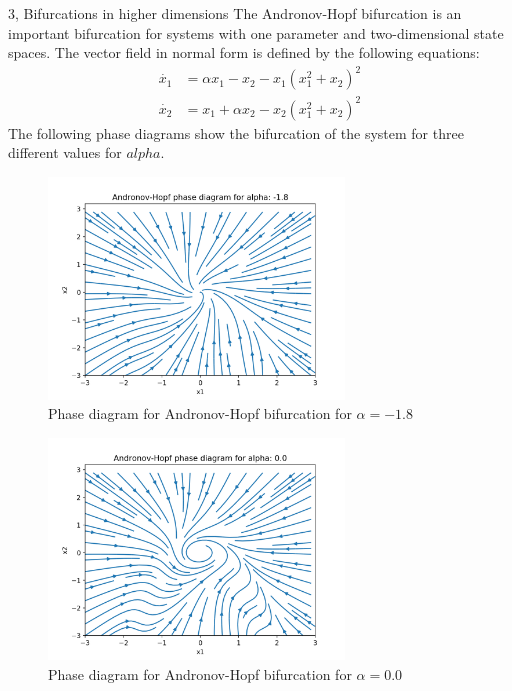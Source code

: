 \documentclass[10pt,a4paper]{article}
\begin{document}
\begin{task}{3, Bifurcations in higher dimensions}
The Andronov-Hopf bifurcation is an important bifurcation for systems with one parameter and two-dimensional state spaces. The vector field in normal form is defined by the following equations:
\begin{align*}
    \dot{x_1} &= \alpha x_1 - x_2-x_1(x_1^2+x_2)^2\\ 
    \dot{x_2}&=x_1+\alpha x_2 -x_2(x_1^2+x_2)^2
\end{align*}
The following phase diagrams  show the bifurcation of the system for three different values for $alpha$.
\begin{figure}[H]
    \centering
    \includegraphics[width=0.7\textwidth]{../plots/Andronov_1,8.png}
    \caption{Phase diagram for Andronov-Hopf bifurcation for $\alpha = -1.8$}
    \label{fig:task3_-1.8}
\end{figure}
\begin{figure}[H]
    \centering
    \includegraphics[width=0.7\textwidth]{../plots/Andronov_0.png}
    \caption{Phase diagram for Andronov-Hopf bifurcation for $\alpha=0.0$}
    \label{fig:task3_0.0}
\end{figure}
\begin{figure}[H]

\end{figure}
\end{task}
\end{document}

